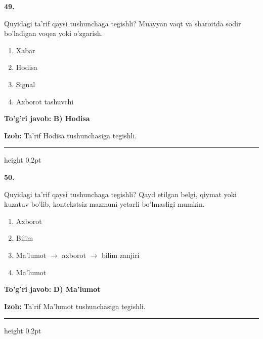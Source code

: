 \documentclass[10pt,a4paper,oneside]{article}
\begin{document}
\noindent\textbf{\color{ink}49.}
\par
Quyidagi ta'rif qaysi tushunchaga tegishli? Muayyan vaqt va sharoitda sodir bo'ladigan voqea yoki o'zgarish.
\begin{enumerate}[label=\Alph*),leftmargin=9mm]
\item Xabar
\item Hodisa
\item Signal
\item Axborot tashuvchi
\end{enumerate}
\begin{tcolorbox}[enhanced,breakable,colback=teal!4,colframe=teal!50!black,boxrule=0.5pt,arc=1.1mm,left=3mm,right=3mm,top=1.7mm,bottom=1.7mm,before skip=2mm,after skip=2mm]
\textbf{\color{teal}To'g'ri javob:} \textbf{B) Hodisa}
\par\smallskip
\textbf{Izoh:} Ta'rif Hodisa tushunchasiga tegishli.
\end{tcolorbox}
\vspace{2mm}\hrule height 0.2pt \vspace{3mm}

\noindent\textbf{\color{ink}50.}
\par
Quyidagi ta'rif qaysi tushunchaga tegishli? Qayd etilgan belgi, qiymat yoki kuzatuv bo'lib, kontekstsiz mazmuni yetarli bo'lmasligi mumkin.
\begin{enumerate}[label=\Alph*),leftmargin=9mm]
\item Axborot
\item Bilim
\item Ma'lumot \ensuremath{\to} axborot \ensuremath{\to} bilim zanjiri
\item Ma'lumot
\end{enumerate}
\begin{tcolorbox}[enhanced,breakable,colback=teal!4,colframe=teal!50!black,boxrule=0.5pt,arc=1.1mm,left=3mm,right=3mm,top=1.7mm,bottom=1.7mm,before skip=2mm,after skip=2mm]
\textbf{\color{teal}To'g'ri javob:} \textbf{D) Ma'lumot}
\par\smallskip
\textbf{Izoh:} Ta'rif Ma'lumot tushunchasiga tegishli.
\end{tcolorbox}
\vspace{2mm}\hrule height 0.2pt \vspace{3mm}
\end{document}
